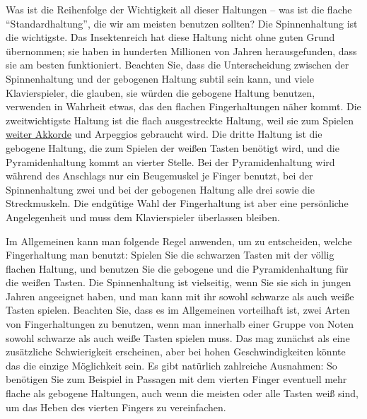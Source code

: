 Was ist die Reihenfolge der Wichtigkeit all dieser Haltungen -- was ist die flache \enquote{Standardhaltung}, die wir am meisten benutzen sollten?
Die Spinnenhaltung ist die wichtigste.
Das Insektenreich hat diese Haltung nicht ohne guten Grund übernommen; sie haben in hunderten Millionen von Jahren herausgefunden, dass sie am besten funktioniert.
Beachten Sie, dass die Unterscheidung zwischen der Spinnenhaltung und der gebogenen Haltung subtil sein kann, und viele Klavierspieler, die glauben, sie würden die gebogene Haltung benutzen, verwenden in Wahrheit etwas, das den flachen Fingerhaltungen näher kommt.
Die zweitwichtigste Haltung ist die flach ausgestreckte Haltung, weil sie zum Spielen \hyperref[c1iii7e]{weiter Akkorde} und Arpeggios gebraucht wird.
Die dritte Haltung ist die gebogene Haltung, die zum Spielen der weißen Tasten benötigt wird, und die Pyramidenhaltung kommt an vierter Stelle.
Bei der Pyramidenhaltung wird während des Anschlags nur ein Beugemuskel je Finger benutzt, bei der Spinnenhaltung zwei und bei der gebogenen Haltung alle drei sowie die Streckmuskeln.
Die endgütige Wahl der Fingerhaltung ist aber eine persönliche Angelegenheit und muss dem Klavierspieler überlassen bleiben.

Im Allgemeinen kann man folgende Regel anwenden, um zu entscheiden, welche Fingerhaltung man benutzt:
Spielen Sie die schwarzen Tasten mit der völlig flachen Haltung, und benutzen Sie die gebogene und die Pyramidenhaltung für die weißen Tasten.
Die Spinnenhaltung ist vielseitig, wenn Sie sie sich in jungen Jahren angeeignet haben, und man kann mit ihr sowohl schwarze als auch weiße Tasten spielen.
Beachten Sie, dass es im Allgemeinen vorteilhaft ist, zwei Arten von Fingerhaltungen zu benutzen, wenn man innerhalb einer Gruppe von Noten sowohl schwarze als auch weiße Tasten spielen muss.
Das mag zunächst als eine zusätzliche Schwierigkeit erscheinen, aber bei hohen Geschwindigkeiten könnte das die einzige Möglichkeit sein.
Es gibt natürlich zahlreiche Ausnahmen: So benötigen Sie zum Beispiel in Passagen mit dem vierten Finger eventuell mehr flache als gebogene Haltungen, auch wenn die meisten oder alle Tasten weiß sind, um das Heben des vierten Fingers zu vereinfachen.

